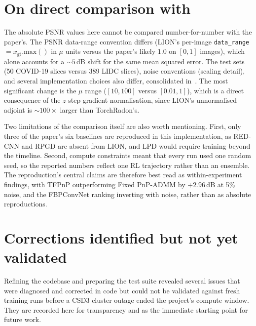 \section{On direct comparison with~\citet{Wei2022TFPnP}}
\label{sec:direct-comparison}

The absolute PSNR values here cannot be compared number-for-number with the paper's. The PSNR data-range convention differs (LION's per-image \texttt{data\_range} $= x_{\text{gt}}.\text{max}()$ in $\mu$ units versus the paper's likely $1.0$ on $[0,1]$ images), which alone accounts for a $\sim 5$\,dB shift for the same mean squared error. The test sets (50 COVID-19 slices versus 389 LIDC slices), noise conventions (scaling detail), and several implementation choices also differ, consolidated in~. The most significant change is the $\mu$ range ($[10,100]$ versus $[0.01,1]$), which is a direct consequence of the $z$-step gradient normalisation, since LION's unnormalised adjoint is $\sim100\times$ larger than TorchRadon's.

Two limitations of the comparison itself are also worth mentioning. First, only three of the paper's six baselines are reproduced in this implementation, as RED-CNN and RPGD are absent from LION, and LPD would require training beyond the timeline. Second, compute constraints meant that every run used one random seed, so the reported numbers reflect one RL trajectory rather than an ensemble. The reproduction's central claims are therefore best read as within-experiment findings, with TFPnP outperforming Fixed PnP-ADMM by $+2.96$\,dB at 5\% noise, and the FBPConvNet ranking inverting with noise, rather than as absolute reproductions.

\section{Corrections identified but not yet validated}
\label{sec:corrections}

Refining the codebase and preparing the test suite revealed several issues that were diagnosed and corrected in code but could not be validated against fresh training runs before a CSD3 cluster outage ended the project's compute window. They are recorded here for transparency and as the immediate starting point for future work.

